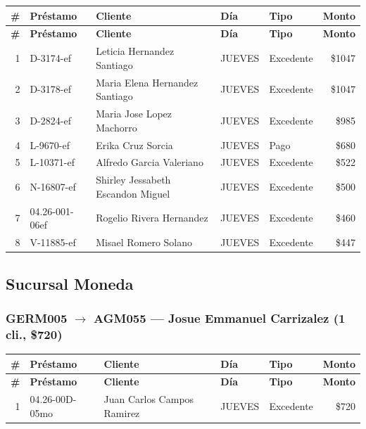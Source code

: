 \documentclass[11pt,a4paper]{article}
\newcommand{\money}[1]{\$\num{#1}}
\begin{document}
\begin{center}
\renewcommand{\arraystretch}{1.1}
\footnotesize
\begin{longtable}{rlp{5.5cm}llr}
\toprule
\textbf{\#} & \textbf{Pr\'estamo} & \textbf{Cliente} & \textbf{D\'ia} & \textbf{Tipo} & \textbf{Monto} \\
\midrule
\endfirsthead
\toprule
\textbf{\#} & \textbf{Pr\'estamo} & \textbf{Cliente} & \textbf{D\'ia} & \textbf{Tipo} & \textbf{Monto} \\
\midrule
\endhead
1 & D-3174-ef & Leticia Hernandez Santiago & JUEVES & Excedente & \money{1047} \\
2 & D-3178-ef & Maria Elena Hernandez Santiago & JUEVES & Excedente & \money{1047} \\
3 & D-2824-ef & Maria Jose Lopez Machorro & JUEVES & Excedente & \money{985} \\
4 & L-9670-ef & Erika Cruz Sorcia & JUEVES & Pago & \money{680} \\
5 & L-10371-ef & Alfredo Garcia Valeriano & JUEVES & Excedente & \money{522} \\
6 & N-16807-ef & Shirley Jessabeth Escandon Miguel & JUEVES & Excedente & \money{500} \\
7 & 04.26-001-06ef & Rogelio Rivera Hernandez & JUEVES & Excedente & \money{460} \\
8 & V-11885-ef & Misael Romero Solano & JUEVES & Excedente & \money{447} \\

\bottomrule
\end{longtable}
\end{center}
\subsection{Sucursal Moneda}

\subsubsection{GERM005 $\rightarrow$ AGM055 --- Josue Emmanuel Carrizalez (1 cli., \money{720})}


\begin{center}
\renewcommand{\arraystretch}{1.1}
\footnotesize
\begin{longtable}{rlp{5.5cm}llr}
\toprule
\textbf{\#} & \textbf{Pr\'estamo} & \textbf{Cliente} & \textbf{D\'ia} & \textbf{Tipo} & \textbf{Monto} \\
\midrule
\endfirsthead
\toprule
\textbf{\#} & \textbf{Pr\'estamo} & \textbf{Cliente} & \textbf{D\'ia} & \textbf{Tipo} & \textbf{Monto} \\
\midrule
\endhead
1 & 04.26-00D-05mo & Juan Carlos Campos Ramirez & JUEVES & Excedente & \money{720} \\

\bottomrule
\end{longtable}
\end{center}
\end{document}
